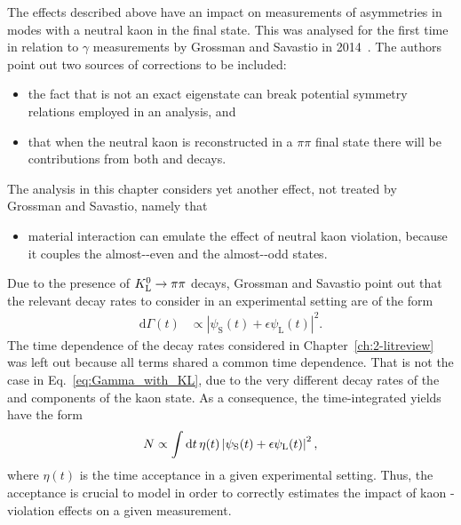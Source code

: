 The effects described above have an impact on measurements of \CP asymmetries in modes with a neutral kaon in the final state. This was analysed for the first time in relation to $\gamma$ measurements by Grossman and Savastio in 2014~\cite{grossmanEffectsBarMixing2014}. The authors point out two sources of corrections to be included:
\begin{itemize}
    \item the fact that \KS is not an exact \CP eigenstate can break potential symmetry relations employed in an analysis, and
    \item that when the neutral kaon is reconstructed in a $\pi\pi$ final state there will be contributions from both \KS and \KL decays.
\end{itemize}
The analysis in this chapter considers yet another effect, not treated by Grossman and Savastio, namely that
\begin{itemize}
  \item material interaction can emulate the effect of neutral kaon \CP violation, because it couples the almost-\CP-even \KS and the almost-\CP-odd \KL states.  
\end{itemize}
Due to the presence of ${{K}^0_{\mathrm{L}}}\rightarrow\pi\pi$ decays, Grossman and Savastio point out that the relevant decay rates to consider in an experimental setting are of the form
\begin{align}\label{eq:Gamma_with_KL}
    \text{d} \Gamma(t) &\propto \left|\psi_\text{S}(t) + \epsilon \psi_\text{L}(t)\right|^2.
\end{align}
The time dependence of the decay rates considered in Chapter~\ref{ch:2-litreview} was left out because all terms shared a common time dependence. That is not the case in Eq.~\eqref{eq:Gamma_with_KL}, due to the very different decay rates of the \KS and \KL components of the kaon state. As a consequence, the time-integrated yields have the form
\begin{align}
  N \propto  \int \text d t \,\eta(t)\left|\psi_\text{S}(t) + \epsilon \psi_\text{L}(t)\right|^2,
\end{align}
where $\eta(t)$ is the time acceptance in a given experimental setting. Thus, the acceptance is crucial to model in order to correctly estimates the impact of kaon \CP-violation effects on a given measurement.

